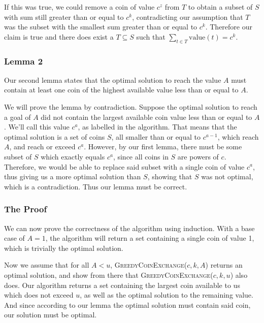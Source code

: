 \documentclass{article}
\begin{document}
If this was true, we could remove a coin of value \(c^z\) from \(T\) to obtain a subset of \(S\) with sum still greater than or equal to \(c^k\), contradicting our assumption that \(T\) was the subset with the smallest sum greater than or equal to \(c^k\). Therefore our claim is true and there does exist a \(T \subseteq S\) such that \(\sum_{t \in T}\text{value}(t) = c^k\).

\subsubsection*{Lemma 2}

Our second lemma states that the optimal solution to reach the value \(A\) must contain at least one coin of the highest available value less than or equal to \(A\).

We will prove the lemma by contradiction. Suppose the optimal solution to reach a goal of \(A\) did not contain the largest available coin value less than or equal to \(A\). We'll call this value \(c^a\), as labelled in the algorithm. That means that the optimal solution is a set of coins \(S\), all smaller than or equal to \(c^{a-1}\), which reach \(A\), and reach or exceed \(c^a\). However, by our first lemma, there must be some subset of \(S\) which exactly equals \(c^a\), since all coins in \(S\) are powers of \(c\). Therefore, we would be able to replace said subset with a single coin of value \(c^a\), thus giving us a more optimal solution than \(S\), showing that \(S\) was not optimal, which is a contradiction. Thus our lemma must be correct.

\subsubsection*{The Proof}

We can now prove the correctness of the algorithm using induction. With a base case of \(A=1\), the algorithm will return a set containing a single coin of value 1, which is trivially the optimal solution.

Now we assume that for all \(A < u\), \textsc{GreedyCoinExchange}(\(c, k, A\)) returns an optimal solution, and show from there that \textsc{GreedyCoinExchange}(\(c, k, u\)) also does. Our algorithm returns a set containing the largest coin available to us which does not exceed \(u\), as well as the optimal solution to the remaining value. And since according to our lemma the optimal solution must contain said coin, our solution must be optimal.
\end{document}
